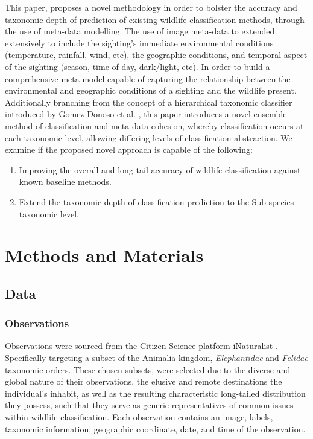 \documentclass[conference]{IEEEtran}
\begin{document}
    This paper, proposes a novel methodology in order to bolster the accuracy and taxonomic depth of prediction of existing wildlife classification methods, through the use of meta-data modelling. 
    The use of image meta-data to extended extensively to include the sighting's immediate environmental conditions (temperature, rainfall, wind, etc), the geographic conditions, and temporal aspect of the sighting (season, time of day, dark/light, etc). In order to build a comprehensive meta-model capable of capturing the relationship between the environmental and geographic conditions of a sighting and the wildlife present.
    Additionally branching from the concept of a hierarchical taxonomic classifier introduced by Gomez-Donoso et al. \cite{gomez-donoso_escalona_pérez-esteve_cazorla_2021}, this paper introduces a novel ensemble method of classification and meta-data cohesion, whereby classification occurs at each taxonomic level, allowing differing levels of classification abstraction. 
    We examine if the proposed novel approach is capable of the following: 
    \\
    
    \begin{enumerate}
        \item Improving the overall and long-tail accuracy of wildlife classification against known baseline methods. 
        \item Extend the taxonomic depth of classification prediction to the Sub-species taxonomic level.
    \end{enumerate}


    
\section{Methods and Materials}
    \subsection{Data}
        \subsubsection{Observations}
        Observations were sourced from the Citizen Science platform iNaturalist \cite{iNaturalist}. Specifically targeting a subset of the Animalia kingdom, \textit{Elephantidae} and \textit{Felidae} taxonomic orders. These chosen subsets, were selected due to the diverse and global nature of their observations, the elusive and remote destinations the individual's inhabit, as well as the resulting characteristic long-tailed distribution they possess, such that they serve as generic representatives of common issues within wildlife classification. Each observation contains an image, labels, taxonomic information, geographic coordinate, date, and time of the observation.
\end{document}
